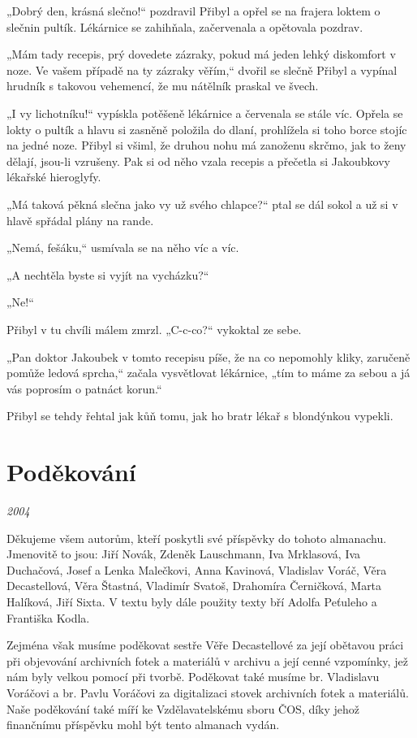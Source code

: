 „Dobrý den, krásná slečno!{}`` pozdravil Přibyl a opřel se na frajera
loktem o slečnin pultík. Lékárnice se zahihňala, začervenala a opětovala
pozdrav.

„Mám tady recepis, prý dovedete zázraky, pokud má jeden lehký diskomfort
v noze. Ve vašem případě na ty zázraky věřím,`` dvořil se slečně Přibyl
a vypínal hrudník s takovou vehemencí, že mu nátělník praskal ve švech.

„I vy lichotníku!{}`` vypískla potěšeně lékárnice a červenala se stále
víc. Opřela se lokty o pultík a hlavu si zasněně položila do dlaní,
prohlížela si toho borce stojíc na jedné noze. Přibyl si všiml, že
druhou nohu má zanoženu skrčmo, jak to ženy dělají, jsou-li vzrušeny.
Pak si od něho vzala recepis a přečetla si Jakoubkovy lékařské
hieroglyfy.

„Má taková pěkná slečna jako vy už svého chlapce?{}`` ptal se dál sokol
a už si v hlavě spřádal plány na rande.

„Nemá, fešáku,`` usmívala se na něho víc a víc.

„A nechtěla byste si vyjít na vycházku?{}``

„Ne!{}``

Přibyl v tu chvíli málem zmrzl. „C-c-co?{}`` vykoktal ze sebe.

„Pan doktor Jakoubek v tomto recepisu píše, že na co nepomohly kliky,
zaručeně pomůže ledová sprcha,`` začala vysvětlovat lékárnice, „tím to
máme za sebou a já vás poprosím o patnáct korun.``

Přibyl se tehdy řehtal jak kůň tomu, jak ho bratr lékař s blondýnkou
vypekli.

\section{\texorpdfstring{Poděkování
}{Poděkování }}\label{podux11bkovuxe1nuxed}

\emph{2004}

Děkujeme všem autorům, kteří poskytli své příspěvky do tohoto almanachu.
Jmenovitě to jsou: Jiří Novák, Zdeněk Lauschmann, Iva Mrklasová, Iva
Duchačová, Josef a Lenka Malečkovi, Anna Kavinová, Vladislav Voráč, Věra
Decastellová, Věra Štastná, Vladimír Svatoš, Drahomíra Černičková, Marta
Halíková, Jiří Sixta. V textu byly dále použity texty bří Adolfa
Peťuleho a Františka Kodla.

Zejména však musíme poděkovat sestře Věře Decastellové za její obětavou
práci při objevování archivních fotek a materiálů v archivu a její cenné
vzpomínky, jež nám byly velkou pomocí při tvorbě. Poděkovat také musíme
br. Vladislavu Voráčovi a br. Pavlu Voráčovi za digitalizaci stovek
archivních fotek a materiálů. Naše poděkování také míří ke
Vzdělavatelskému sboru ČOS, díky jehož finančnímu příspěvku mohl být
tento almanach vydán.


